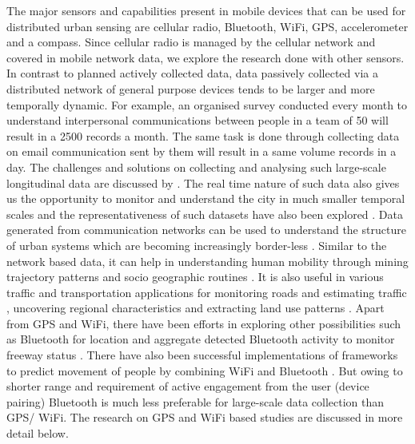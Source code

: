 The major sensors and capabilities present in mobile devices that can be used for distributed urban sensing are cellular radio, Bluetooth, WiFi, GPS, accelerometer and a compass.
Since cellular radio is managed by the cellular network and covered in mobile network data, we explore the research done with other sensors.
In contrast to planned actively collected data, data passively collected via a distributed network of general purpose devices tends to be larger and more temporally dynamic.
For example, an organised survey conducted every month to understand interpersonal communications between people in a team of 50 will result in a 2500 records a month.
The same task is done through collecting data on email communication sent by them will result in a same volume records in a day.
The challenges and solutions on collecting and analysing such large-scale longitudinal data are discussed by \citep{laurila2012, antonic2013}.
The real time nature of such data also gives us the opportunity to monitor and understand the city in much smaller temporal scales \citep{townsend2000, oneill2006} and the representativeness of such datasets have also been explored \citep{shin 2013, Kobus 2013}.
Data generated from communication networks can be used to understand the structure of urban systems which are becoming increasingly border-less \cite{bertolini2003}.
Similar to the network based data, it can help in understanding human mobility \citep{asgari2013, amini2014, zhang2014} through mining trajectory patterns \citep{giannotti2007} and socio geographic routines \citep{farrahi2010}.
It is also useful in various traffic and transportation applications for monitoring roads \citep{mohan2008} and estimating traffic \citep{cheng2006}, uncovering regional characteristics \citep{chi2014} and extracting land use patterns \citep{shimosaka2014}.
Apart from GPS and WiFi, there have been efforts in exploring other possibilities such as Bluetooth for location \citep{bandara2004} and aggregate detected Bluetooth activity to monitor freeway status \citep{haghani2010}.
There have also been successful implementations of frameworks to predict movement of people by combining WiFi and Bluetooth \citep{vu2011}.
But owing to shorter range and requirement of active engagement from the user (device pairing) Bluetooth is much less preferable for large-scale data collection than GPS/ WiFi.
The research on GPS and WiFi based studies are discussed in more detail below.

